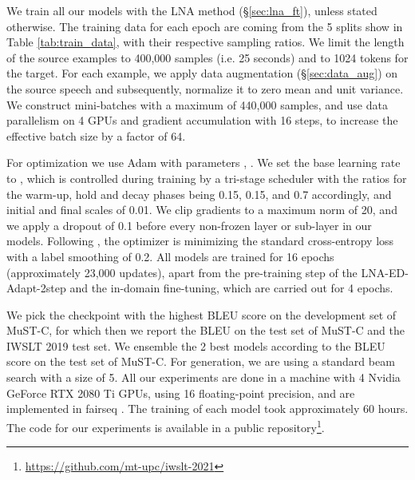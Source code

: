 \documentclass[11pt,a4paper]{article}
\begin{document}
        We train all our models with the LNA method (\S \ref{sec:lna_ft}), unless stated otherwise. The training data for each epoch are coming from the 5 splits show in  Table \ref{tab:train_data}, with their respective sampling ratios. We limit the length of the source examples to 400,000 samples (i.e. 25 seconds) and to 1024 tokens for the target. For each example, we apply data augmentation (\S \ref{sec:data_aug}) on the source speech and subsequently, normalize it to zero mean and unit variance. We construct mini-batches with a maximum of 440,000 samples, and use data parallelism on 4 GPUs and gradient accumulation with 16 steps, to increase the effective batch size by a factor of 64.
        
        For optimization we use Adam \cite{adam} with parameters , . We set the base learning rate to , which is controlled during training by a tri-stage scheduler with the ratios for the warm-up, hold and decay phases being 0.15, 0.15, and 0.7 accordingly, and initial and final scales of 0.01. We clip gradients to a maximum norm of 20, and we apply a dropout of 0.1 before every non-frozen layer or sub-layer in our models. Following \citet{mBART25}, the optimizer is minimizing the standard cross-entropy loss with a label smoothing of 0.2. All models are trained for 16 epochs (approximately 23,000 updates), apart from the pre-training step of the LNA-ED-Adapt-2step and the in-domain fine-tuning, which are carried out for 4 epochs.
        
        We pick the checkpoint with the highest BLEU score on the development set of MuST-C, for which then we report the BLEU on the test set of MuST-C and the IWSLT 2019 test set. We ensemble the 2 best models according to the BLEU score on the test set of MuST-C. For generation, we are using a standard beam search with a size of 5. All our experiments are done in a machine with 4 Nvidia GeForce RTX 2080 Ti GPUs, using 16 floating-point precision, and are implemented in fairseq \cite{wang-etal-2020-fairseq}. The training of each model took approximately 60 hours. The code for our experiments is available in a public repository\footnote{\url{https://github.com/mt-upc/iwslt-2021}}.
        
\end{document}
